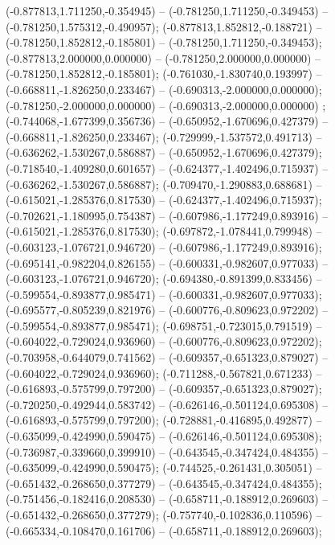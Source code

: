  (-0.877813,1.711250,-0.354945) -- (-0.781250,1.711250,-0.349453) -- (-0.781250,1.575312,-0.490957);
 (-0.877813,1.852812,-0.188721) -- (-0.781250,1.852812,-0.185801) -- (-0.781250,1.711250,-0.349453);
 (-0.877813,2.000000,0.000000) -- (-0.781250,2.000000,0.000000) -- (-0.781250,1.852812,-0.185801);
 (-0.761030,-1.830740,0.193997) -- (-0.668811,-1.826250,0.233467) -- (-0.690313,-2.000000,0.000000);
 (-0.781250,-2.000000,0.000000) -- (-0.690313,-2.000000,0.000000) ;
 (-0.744068,-1.677399,0.356736) -- (-0.650952,-1.670696,0.427379) -- (-0.668811,-1.826250,0.233467);
 (-0.729999,-1.537572,0.491713) -- (-0.636262,-1.530267,0.586887) -- (-0.650952,-1.670696,0.427379);
 (-0.718540,-1.409280,0.601657) -- (-0.624377,-1.402496,0.715937) -- (-0.636262,-1.530267,0.586887);
 (-0.709470,-1.290883,0.688681) -- (-0.615021,-1.285376,0.817530) -- (-0.624377,-1.402496,0.715937);
 (-0.702621,-1.180995,0.754387) -- (-0.607986,-1.177249,0.893916) -- (-0.615021,-1.285376,0.817530);
 (-0.697872,-1.078441,0.799948) -- (-0.603123,-1.076721,0.946720) -- (-0.607986,-1.177249,0.893916);
 (-0.695141,-0.982204,0.826155) -- (-0.600331,-0.982607,0.977033) -- (-0.603123,-1.076721,0.946720);
 (-0.694380,-0.891399,0.833456) -- (-0.599554,-0.893877,0.985471) -- (-0.600331,-0.982607,0.977033);
 (-0.695577,-0.805239,0.821976) -- (-0.600776,-0.809623,0.972202) -- (-0.599554,-0.893877,0.985471);
 (-0.698751,-0.723015,0.791519) -- (-0.604022,-0.729024,0.936960) -- (-0.600776,-0.809623,0.972202);
 (-0.703958,-0.644079,0.741562) -- (-0.609357,-0.651323,0.879027) -- (-0.604022,-0.729024,0.936960);
 (-0.711288,-0.567821,0.671233) -- (-0.616893,-0.575799,0.797200) -- (-0.609357,-0.651323,0.879027);
 (-0.720250,-0.492944,0.583742) -- (-0.626146,-0.501124,0.695308) -- (-0.616893,-0.575799,0.797200);
 (-0.728881,-0.416895,0.492877) -- (-0.635099,-0.424990,0.590475) -- (-0.626146,-0.501124,0.695308);
 (-0.736987,-0.339660,0.399910) -- (-0.643545,-0.347424,0.484355) -- (-0.635099,-0.424990,0.590475);
 (-0.744525,-0.261431,0.305051) -- (-0.651432,-0.268650,0.377279) -- (-0.643545,-0.347424,0.484355);
 (-0.751456,-0.182416,0.208530) -- (-0.658711,-0.188912,0.269603) -- (-0.651432,-0.268650,0.377279);
 (-0.757740,-0.102836,0.110596) -- (-0.665334,-0.108470,0.161706) -- (-0.658711,-0.188912,0.269603);

